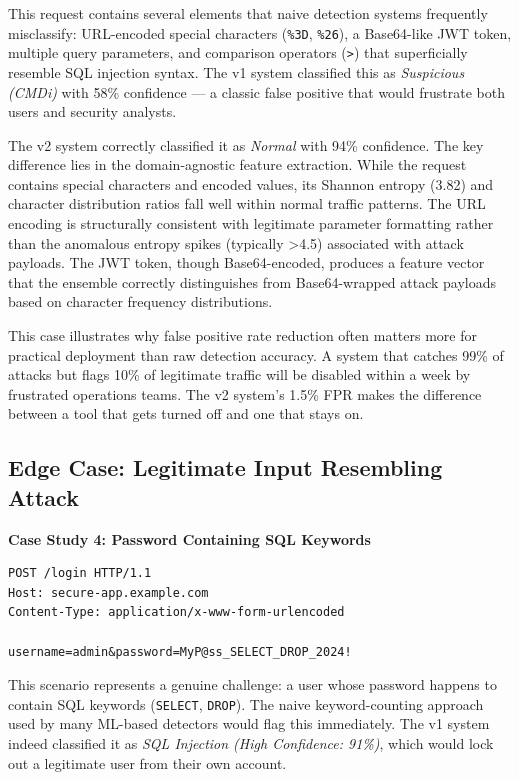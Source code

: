 \documentclass[journal,onecolumn]{IEEEtran}
\begin{document}
This request contains several elements that naive detection systems frequently misclassify: URL-encoded special characters (\texttt{\%3D}, \texttt{\%26}), a Base64-like JWT token, multiple query parameters, and comparison operators (\texttt{>}) that superficially resemble SQL injection syntax. The v1 system classified this as \textit{Suspicious (CMDi)} with 58\% confidence --- a classic false positive that would frustrate both users and security analysts.

The v2 system correctly classified it as \textit{Normal} with 94\% confidence. The key difference lies in the domain-agnostic feature extraction. While the request contains special characters and encoded values, its Shannon entropy (3.82) and character distribution ratios fall well within normal traffic patterns. The URL encoding is structurally consistent with legitimate parameter formatting rather than the anomalous entropy spikes (typically >4.5) associated with attack payloads. The JWT token, though Base64-encoded, produces a feature vector that the ensemble correctly distinguishes from Base64-wrapped attack payloads based on character frequency distributions.

This case illustrates why false positive rate reduction often matters more for practical deployment than raw detection accuracy. A system that catches 99\% of attacks but flags 10\% of legitimate traffic will be disabled within a week by frustrated operations teams. The v2 system's 1.5\% FPR makes the difference between a tool that gets turned off and one that stays on.

\subsection{Edge Case: Legitimate Input Resembling Attack}

\textbf{Case Study 4: Password Containing SQL Keywords}

\begin{lstlisting}[caption={Authentication request with password resembling SQL injection.}, basicstyle=\ttfamily\footnotesize, breaklines=true]
POST /login HTTP/1.1
Host: secure-app.example.com
Content-Type: application/x-www-form-urlencoded

username=admin&password=MyP@ss_SELECT_DROP_2024!
\end{lstlisting}

This scenario represents a genuine challenge: a user whose password happens to contain SQL keywords (\texttt{SELECT}, \texttt{DROP}). The naive keyword-counting approach used by many ML-based detectors would flag this immediately. The v1 system indeed classified it as \textit{SQL Injection (High Confidence: 91\%)}, which would lock out a legitimate user from their own account.
\end{document}
